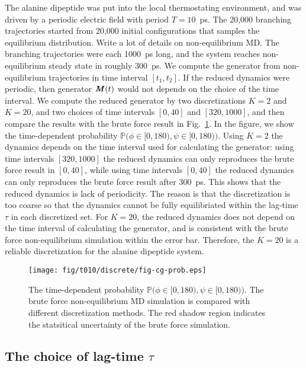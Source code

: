 \documentclass[aps, pre, preprint,unsortedaddress,a4paper,onecolumn]{revtex4}
\newcommand{\redc}[1]{{\color{red} #1}}
\newcommand{\vect}[1]{\textbf{\textit{#1}}}
\begin{document}
The alanine dipeptide was put into the local thermostating
environment, and was driven by a periodic electric field with period
$T = 10$~ps. The 20,000 branching trajectories started from 20,000
initial configurations that samples the equilibrium distribution.
\redc{Write a lot of details on non-equilibrium MD.}  The branching
trajectories were each 1000~ps long, and the system reaches
non-equilibrium steady state in roughly 300~ps. We compute the
generator from non-equilibrium trajectories in time interval $[t_1,
t_2]$. If the reduced dynamics were periodic, then generator $\vect
M(t)$ would not depends on the choice of the time interval. We compute
the reduced generator by two discretizations $K=2$ and $K=20$, and two
choices of time intervals $[0, 40]$ and $[320, 1000]$, and then
compare the results with the brute force result in
Fig.~\ref{fig:tmp2}. In the figure, we show the time-dependent
probability $\mathbb P\big(\phi\in[0,180), \psi\in [0,180)\big)$.
Using $K=2$ the dynamics depends on the time interval used for
calculating the generator: using time intervals $[320, 1000]$ the reduced
dynamics can only reproduces the brute force result in $[0, 40]$,
while using time intervals $[0, 40]$ the reduced dynamics can only
reproduces the brute force result after 300~ps.  This shows that the
reduced dynamics is lack of periodicity.  The reason is that the
discretization is too coarse so that the dynamics cannot be fully
equilibriated within the lag-time $\tau$ in each discretized set.  For
$K=20$, the reduced dynamics does not depend on the time interval of
calculating the generator, and is consistent with the brute force
non-equilibrium simulation within the error bar. Therefore, the $K=20$
is a reliable discretization for the alanine dipeptide system.


\begin{figure}
  \centering
  \texttt{[image: fig/t010/discrete/fig-cg-prob.eps]}  
  \caption{The time-dependent probability $\mathbb
    P\big(\phi\in[0,180), \psi\in [0,180)\big)$.  The brute force
    non-equilibrium MD simulation is compared with different
    discretization methods. The red shadow region indicates the
    statsitical uncertainty of the brute force simulation.}
  \label{fig:tmp2}
\end{figure}


\subsection{The choice of lag-time $\tau$}
\end{document}
